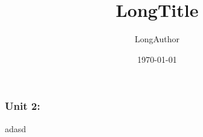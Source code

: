 \documentclass[12pt,t]{beamer}
\title[ShortTitle]{LongTitle}
\author[ShortAuthor]{LongAuthor}
\date{\today}
\institute{Universität Oldenburg}
\begin{document}
\frame{\titlepage}


\begin{frame}
	\frametitle{Unit 2: }
adasd
\end{frame}





\end{document}
